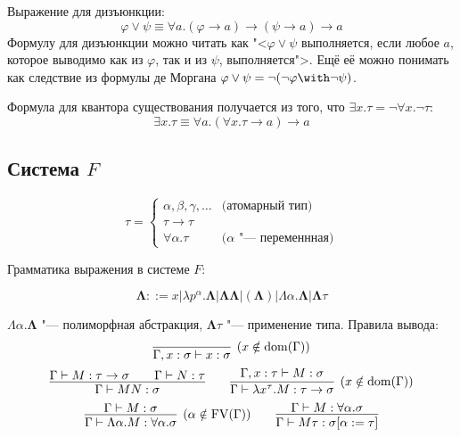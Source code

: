 Выражение для дизъюнкции:
\[
    \varphi \vee \psi \equiv \forall a . (\varphi \to a) \to (\psi \to a) \to a
\]
Формулу для дизъюнкции можно читать как "<$\varphi \vee \psi$ выполняется,
если любое $a$, которое выводимо как из $\varphi$, так и из $\psi$, выполняется">.
Ещё её можно понимать как следствие из формулы де Моргана $\varphi\vee\psi=\neg(\neg\varphi\with\neg\psi)$.

Формула для квантора существования получается из того, что $\exists x . \tau = \neg \forall x . \neg \tau$:
\[
    \exists x . \tau \equiv \forall a . (\forall x . \tau \to a) \to a
\]

\subsection{\texorpdfstring{Система $F$}{System F}}
\begin{definition}
\[
    \tau =
    \begin{cases}
        \alpha, \beta, \gamma, \ldots & \text{(атомарный тип)} \\
        \tau \to \tau \\
        \forall \alpha . \tau & \text{($\alpha$ "--- переменнная)}
    \end{cases}
\]
\end{definition}

\begin{definition}[система $F$]
Грамматика выражения в системе $F$:
    \begin{bnf}
    \[
        \mathbf\Lambda ::= x | \lambda p^\alpha . \mathbf\Lambda | \mathbf\Lambda \mathbf\Lambda | (\mathbf\Lambda)
        | \Lambda \alpha . \mathbf\Lambda | \mathbf\Lambda \tau
    \]
    \end{bnf}%
    $\Lambda \alpha . \mathbf\Lambda$ "--- полиморфная абстракция, $\mathbf\Lambda \tau$ "--- применение типа.
    Правила вывода:
    \inferspacing
    \begin{gather*}
        \infer[(x \notin \mathrm{dom}(\Gamma))]{\Gamma, x : \sigma \vdash x : \sigma}{} \\
        \infer{\Gamma \vdash MN : \sigma}{\Gamma \vdash M : \tau \to \sigma && \Gamma \vdash N : \tau} \qquad
        \infer[(x \notin \mathrm{dom}(\Gamma))]
                {\Gamma \vdash \lambda x^\tau . M : \tau \to \sigma}{\Gamma, x : \tau \vdash M : \sigma} \\
        \infer[(\alpha \notin \FV(\Gamma))]{\Gamma \vdash \Lambda \alpha . M : \forall \alpha . \sigma}{\Gamma \vdash M : \sigma} \qquad
        \infer{\Gamma \vdash M \tau : \sigma [\alpha := \tau]}{\Gamma \vdash M : \forall \alpha . \sigma}
    \end{gather*}
\end{definition}

